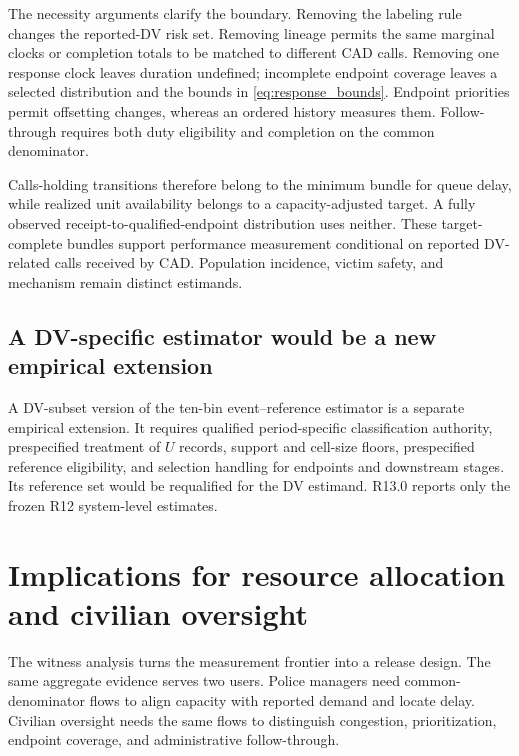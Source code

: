 \documentclass[11pt]{article}
\begin{document}
The necessity arguments clarify the boundary. Removing the labeling rule changes the reported-DV risk set. Removing lineage permits the same marginal clocks or completion totals to be matched to different CAD calls. Removing one response clock leaves duration undefined; incomplete endpoint coverage leaves a selected distribution and the bounds in \cref{eq:response_bounds}. Endpoint priorities permit offsetting changes, whereas an ordered history measures them. Follow-through requires both duty eligibility and completion on the common denominator.

Calls-holding transitions therefore belong to the minimum bundle for queue delay, while realized unit availability belongs to a capacity-adjusted target. A fully observed receipt-to-qualified-endpoint distribution uses neither. These target-complete bundles support performance measurement conditional on reported DV-related calls received by CAD. Population incidence, victim safety, and mechanism remain distinct estimands.

\subsection{A DV-specific estimator would be a new empirical extension}

A DV-subset version of the ten-bin event--reference estimator is a separate empirical extension. It requires qualified period-specific classification authority, prespecified treatment of $U$ records, support and cell-size floors, prespecified reference eligibility, and selection handling for endpoints and downstream stages. Its reference set would be requalified for the DV estimand. R13.0 reports only the frozen R12 system-level estimates.

\section{Implications for resource allocation and civilian oversight}

The witness analysis turns the measurement frontier into a release design. The same aggregate evidence serves two users. Police managers need common-denominator flows to align capacity with reported demand and locate delay. Civilian oversight needs the same flows to distinguish congestion, prioritization, endpoint coverage, and administrative follow-through.
\end{document}
